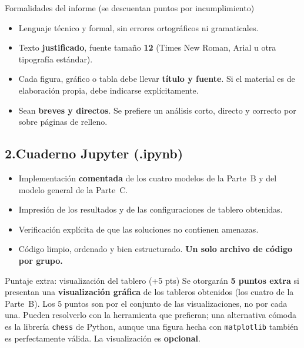 \documentclass[12pt,a4paper]{article}
\begin{document}
\begin{ayuda}{Formalidades del informe (se descuentan puntos por incumplimiento)}
\begin{itemize}[topsep=2pt]
    \item Lenguaje técnico y formal, sin errores ortográficos ni gramaticales.
    \item Texto \textbf{justificado}, fuente tamaño \textbf{12} (Times New Roman,
          Arial u otra tipografía estándar).
    \item Cada figura, gráfico o tabla debe llevar \textbf{título y fuente}. Si el
          material es de elaboración propia, debe indicarse explícitamente.
    \item Sean \textbf{breves y directos}. Se prefiere un análisis corto, directo
          y correcto por sobre páginas de relleno.
\end{itemize}
\end{ayuda}

\subsection*{2.\quad Cuaderno Jupyter (.ipynb)}

\begin{itemize}[topsep=2pt]
    \item Implementación \textbf{comentada} de los cuatro modelos de la Parte~B y
          del modelo general de la Parte~C.
    \item Impresión de los resultados y de las configuraciones de tablero
          obtenidas.
    \item Verificación explícita de que las soluciones no contienen amenazas.
    \item Código limpio, ordenado y bien estructurado. \textbf{Un solo archivo de
          código por grupo.}
\end{itemize}

\begin{ayuda}{Puntaje extra: visualización del tablero (+5 pts)}
\vspace{2pt}
Se otorgarán \textbf{5 puntos extra} si presentan una \textbf{visualización gráfica}
de los tableros obtenidos (los cuatro de la Parte~B). Los 5 puntos son por el
conjunto de las visualizaciones, no por cada una. Pueden resolverlo con la
herramienta que prefieran; una alternativa cómoda es la librería \texttt{chess} de
Python, aunque una figura hecha con \texttt{matplotlib} también es perfectamente
válida. La visualización es \textbf{opcional}.
\end{ayuda}
\end{document}
